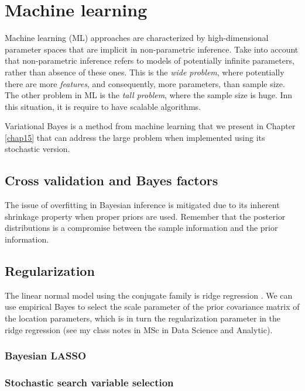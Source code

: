 \chapter{Machine learning}\label{chap13}

Machine learning (ML) approaches are characterized by high-dimensional parameter spaces that are implicit in non-parametric inference. Take into account that non-parametric inference refers to models of potentially infinite parameters, rather than absence of these ones. This is the \textit{wide problem}, where potentially there are more \textit{features}, and consequently, more parameters, than sample size. The other problem in ML is the \textit{tall problem}, where the sample size is huge. Inn this situation, it is require to have scalable algorithms.

Variational Bayes is a method from machine learning \cite{wainwright2008graphical} that we present in Chapter \ref{chap15} that can address the large problem when implemented using its stochastic version.

\section{Cross validation and Bayes factors}\label{sec13_1}
The issue of overfitting in Bayesian inference is mitigated due to its inherent shrinkage property when proper priors are used. Remember that the posterior distributions is a compromise between the sample information and the prior information.

\section{Regularization}\label{sec13_2}
The linear normal model using the conjugate family is ridge regression \cite{Ishwaran2005}. We can use empirical Bayes to select the scale parameter of the prior covariance matrix of the location parameters, which is in turn the regularization parameter in the ridge regression (see my class notes in MSc in Data Science and Analytic).

\subsection{Bayesian LASSO}\label{sec13_21}

\subsection{Stochastic search variable selection}\label{sec13_22}

